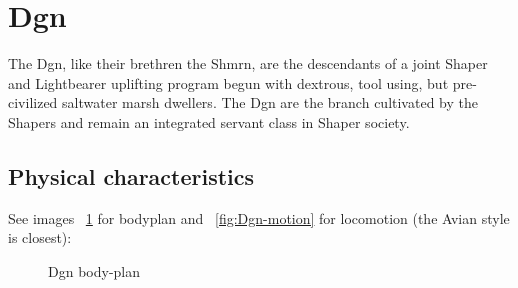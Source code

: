 \section{Dgn}

The Dgn, like their brethren the Shmrn, are the descendants of a joint
Shaper and Lightbearer uplifting program begun with dextrous, tool
using, but pre-civilized saltwater marsh dwellers. The Dgn are the
branch cultivated by the Shapers and remain an integrated servant
class in Shaper society.

\subsection{Physical characteristics}
See images ~\ref{fig:Dgn-body} for bodyplan and ~\ref{fig:Dgn-motion} for locomotion (the Avian style is closest): 

\begin{figure}
\begin{center}
    \caption{Dgn body-plan}
    \label{fig:Dgn-body}
\end{center}
\end{figure}


